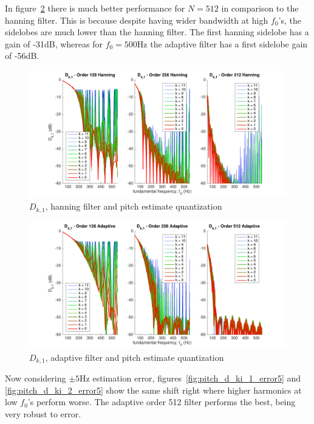 \documentclass [11pt, proquest,oneside] {ganter_thesis}[2015/03/03]
\begin{document}
In  figure~\ref{fig:pitch_d_ki_2} there is much better performance for $N = 512$ in comparison to the hanning filter.  This is because despite having wider bandwidth at high $f_0$'s, the sidelobes are much lower than the hanning filter.  The first hanning sidelobe has a gain of -31dB, whereas for $f_0 = 500$Hz the adaptive filter has a first sidelobe gain of -56dB.

\begin{figure}[!ht]
  \centering
    \includegraphics[width=1\textwidth]{pitch_d_ki_1}
    \caption{$D_{k,1}$, hanning filter and pitch estimate quantization}\label{fig:pitch_d_ki_1}
\end{figure}

\begin{figure}[!ht]
  \centering
    \includegraphics[width=1\textwidth]{pitch_d_ki_2}
    \caption{$D_{k,1}$, adaptive filter and pitch estimate quantization}\label{fig:pitch_d_ki_2}
\end{figure}

Now considering $\pm5$Hz estimation error, figures~\ref{fig:pitch_d_ki_1_error5} and \ref{fig:pitch_d_ki_2_error5} show the same shift right where higher harmonics at low $f_0$'s perform worse.  The adaptive order 512 filter performs the best, being very robust to error.
\end{document}
